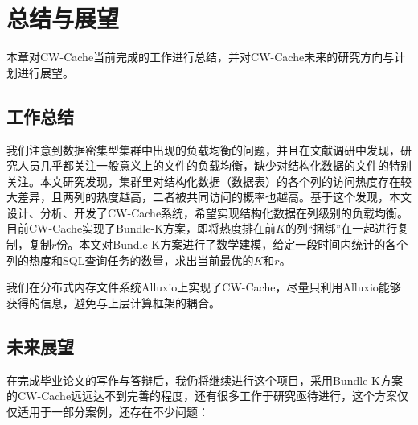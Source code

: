 \chapter{总结与展望}
\label{chp:future}

\par 本章对CW-Cache当前完成的工作进行总结，并对CW-Cache未来的研究方向与计划进行展望。

\section{工作总结}

\par 我们注意到数据密集型集群中出现的负载均衡的问题，并且在文献调研中发现，研究人员几乎都关注一般意义上的文件的负载均衡，缺少对结构化数据的文件的特别关注。本文研究发现，集群里对结构化数据（数据表）的各个列的访问热度存在较大差异，且两列的热度越高，二者被共同访问的概率也越高。基于这个发现，本文设计、分析、开发了CW-Cache系统，希望实现结构化数据在列级别的负载均衡。目前CW-Cache实现了Bundle-K方案，即将热度排在前$K$的列“捆绑”在一起进行复制，复制$r$份。本文对Bundle-K方案进行了数学建模，给定一段时间内统计的各个列的热度和SQL查询任务的数量，求出当前最优的$K$和$r$。

\par 我们在分布式内存文件系统Alluxio上实现了CW-Cache，尽量只利用Alluxio能够获得的信息，避免与上层计算框架的耦合。


\section{未来展望}

\par 在完成毕业论文的写作与答辩后，我仍将继续进行这个项目，采用Bundle-K方案的CW-Cache远远达不到完善的程度，还有很多工作于研究亟待进行，这个方案仅仅适用于一部分案例，还存在不少问题：

